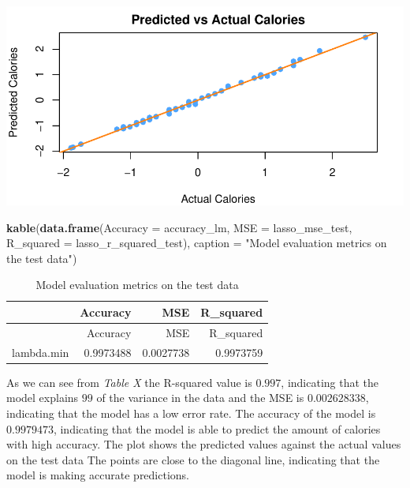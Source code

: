 \documentclass[
]{article}
\newenvironment{Shaded}{\begin{snugshade}}{\end{snugshade}}
\newcommand{\AttributeTok}[1]{\textcolor[rgb]{0.13,0.29,0.53}{#1}}
\newcommand{\FunctionTok}[1]{\textcolor[rgb]{0.13,0.29,0.53}{\textbf{#1}}}
\newcommand{\NormalTok}[1]{#1}
\newcommand{\StringTok}[1]{\textcolor[rgb]{0.31,0.60,0.02}{#1}}
\begin{document}
\begin{center}\includegraphics{Statistical_Learning_Final_Report_files/figure-latex/accuracy_lm-1} \end{center}

\begin{Shaded}
\begin{Highlighting}[]
\FunctionTok{kable}\NormalTok{(}\FunctionTok{data.frame}\NormalTok{(}\AttributeTok{Accuracy =}\NormalTok{ accuracy\_lm, }\AttributeTok{MSE =}\NormalTok{ lasso\_mse\_test, }
                 \AttributeTok{R\_squared =}\NormalTok{ lasso\_r\_squared\_test),}
      \AttributeTok{caption =} \StringTok{"Model evaluation metrics on the test data"}\NormalTok{)}
\end{Highlighting}
\end{Shaded}

\begin{longtable}[]{@{}lrrr@{}}
\caption{Model evaluation metrics on the test data}\tabularnewline
\toprule\noalign{}
& Accuracy & MSE & R\_squared \\
\midrule\noalign{}
\endfirsthead
\toprule\noalign{}
& Accuracy & MSE & R\_squared \\
\midrule\noalign{}
\endhead
\bottomrule\noalign{}
\endlastfoot
lambda.min & 0.9973488 & 0.0027738 & 0.9973759 \\
\end{longtable}

As we can see from \emph{Table X} the R-squared value is \(0.997\),
indicating that the model explains \(99%
\) of the variance in the data and the MSE is \(0.002628338\),
indicating that the model has a low error rate. The accuracy of the
model is \(0.9979473\), indicating that the model is able to predict the
amount of calories with high accuracy. The plot shows the predicted
values against the actual values on the test data The points are close
to the diagonal line, indicating that the model is making accurate
predictions.
\end{document}
